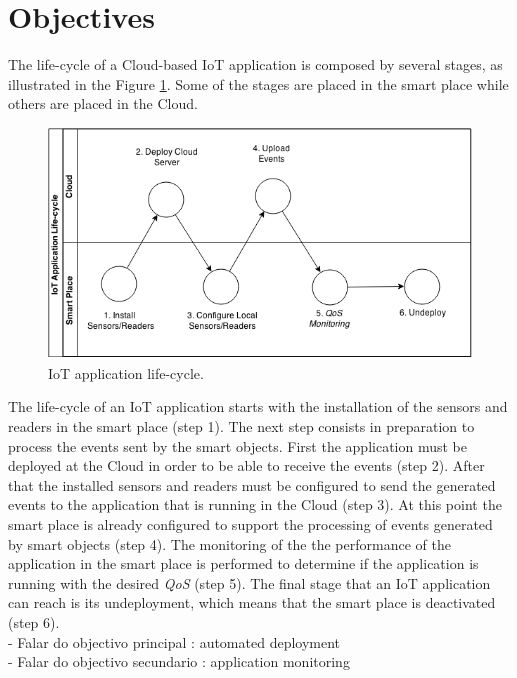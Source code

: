 \section{Objectives}
\label{sec:objectives}
The life-cycle of a Cloud-based IoT application is composed by several stages,
as illustrated in the Figure \ref{fig:life-cycle}. Some of the stages are placed in
the smart place while others are placed in the Cloud.
\begin{figure}[h!]
  \centering
  \includegraphics[width=\textwidth]{./images/life-cycle}
  \caption{IoT application life-cycle.}
  \label{fig:life-cycle}
\end{figure}

The life-cycle of an IoT application starts with the installation of the sensors and
readers in the smart place (step 1). The next step consists in preparation to
process the events sent by the smart objects. First the application must be deployed at
the Cloud in order to be able to receive the events (step 2). After that the installed
sensors and readers must be configured to send the generated events to the application that is
running in the Cloud (step 3). At this point the smart place is already configured to
support the processing of events generated by smart objects (step 4). The monitoring of the
the performance of the application in the smart place is performed to determine if the
application is running  with the desired \textit{QoS} (step 5). The final stage that an IoT
application can reach is its undeployment, which means that the smart place is deactivated (step 6).\\

- Falar do objectivo principal : automated deployment\\
- Falar do objectivo secundario : application monitoring\\

